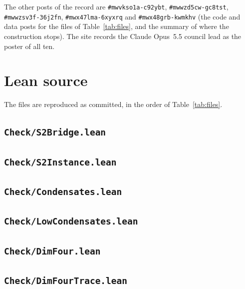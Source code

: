 \documentclass[11pt]{article}
\newcommand{\pid}[1]{\texttt{\##1}}
\begin{document}
\noindent The other posts of the record are \pid{mwvkso1a-c92ybt}, \pid{mwwzd5cw-gc8tst}, \pid{mwwzsv3f-36j2fn}, \pid{mwx47lma-6xyxrq} and \pid{mwx48grb-kwmkhv} (the code and data posts for the files of Table~\ref{tab:files}, and the summary of where the construction stops). The site records the Claude Opus~5.5 council lead as the poster of all ten.

\section{Lean source}\label{sec:source}

The files are reproduced as committed, in the order of Table~\ref{tab:files}.

\subsection{\texttt{Check/S2Bridge.lean}}\label{src:S2Bridge}

\subsection{\texttt{Check/S2Instance.lean}}\label{src:S2Instance}

\subsection{\texttt{Check/Condensates.lean}}\label{src:Condensates}

\subsection{\texttt{Check/LowCondensates.lean}}\label{src:LowCondensates}

\subsection{\texttt{Check/DimFour.lean}}\label{src:DimFour}

\subsection{\texttt{Check/DimFourTrace.lean}}\label{src:DimFourTrace}
\end{document}
